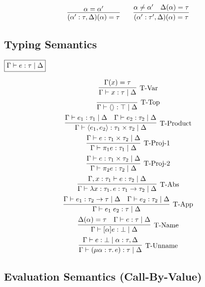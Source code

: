 \begin{gather*}
  \infer{(\alpha': \tau, \Delta)(\alpha) = \tau}{
    \alpha = \alpha'
  }
  \hspace{2em}
  \infer{(\alpha': \tau', \Delta)(\alpha) = \tau}{
    \alpha \neq \alpha'
    &
    \Delta(\alpha) = \tau
  }
\end{gather*}

\subsection{Typing Semantics}

$\fbox{$\Gamma \vdash e: \tau \mid \Delta$}$

\begin{gather*}
  \infer[\text{T-Var}]{\Gamma \vdash x: \tau \mid \Delta}{
    \Gamma(x) = \tau
  }
  \\
  \infer[\text{T-Top}]{\Gamma \vdash \langle\rangle: \top \mid \Delta}{}
  \\
  \infer[\text{T-Product}]{\Gamma \vdash \langle e_1, e_2\rangle: \tau_1 \times \tau_2 \mid \Delta}{
    \Gamma \vdash e_1: \tau_1 \mid \Delta
    &
    \Gamma \vdash e_2: \tau_2 \mid \Delta
  }
  \\
  \infer[\text{T-Proj-1}]{\Gamma \vdash \pi_1 e: \tau_1 \mid \Delta}{
    \Gamma \vdash e: \tau_1 \times \tau_2 \mid \Delta
  }
  \\
  \infer[\text{T-Proj-2}]{\Gamma \vdash \pi_2 e: \tau_2 \mid \Delta}{
    \Gamma \vdash e: \tau_1 \times \tau_2 \mid \Delta
  }
  \\
  \infer[\text{T-Abs}]{\Gamma \vdash \lambda x: \tau_1\ldotp e: \tau_1 \to \tau_2 \mid \Delta}{
    \Gamma, x: \tau_1 \vdash e: \tau_2 \mid \Delta
  }
  \\
  \infer[\text{T-App}]{\Gamma \vdash e_1\; e_2: \tau \mid \Delta}{
    \Gamma \vdash e_1: \tau_2 \to \tau \mid \Delta
    &
    \Gamma \vdash e_2: \tau_2 \mid \Delta
  }
  \\
  \infer[\text{T-Name}]{\Gamma \vdash [\alpha] e: \bot \mid \Delta}{
    \Delta(\alpha) = \tau
    &
    \Gamma \vdash e: \tau \mid \Delta
  }
  \\
  \infer[\text{T-Unname}]{\Gamma \vdash (\mu \alpha: \tau\ldotp e): \tau \mid \Delta}{
    \Gamma \vdash e: \bot \mid \alpha: \tau, \Delta
  }
\end{gather*}

\subsection{Evaluation Semantics (Call-By-Value)}

